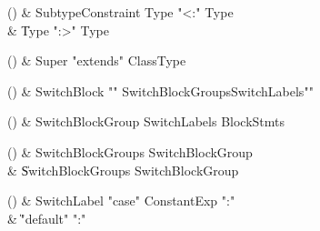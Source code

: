 \begin{bbgrammarappendix}{3.3in}

() & SubtypeConstraint \label{prod:SubtypeConstraint}  \: Type  \xcd"<:" Type   \\

 &    \| Type  \xcd":>" Type  \\

\end{bbgrammarappendix}

\begin{bbgrammarappendix}{4.5in}

() & Super \label{prod:Super}  \: \xcd"extends" ClassType  \\


\end{bbgrammarappendix}

\begin{bbgrammarappendix}{3.9in}

() & SwitchBlock \label{prod:SwitchBlock}  \: \xcd"{" SwitchBlockGroups\opt SwitchLabels\opt \xcd"}"  \\


\end{bbgrammarappendix}

\begin{bbgrammarappendix}{3.4in}

() & SwitchBlockGroup \label{prod:SwitchBlockGroup}  \: SwitchLabels BlockStmts  \\


\end{bbgrammarappendix}

\begin{bbgrammarappendix}{3.3in}

() & SwitchBlockGroups \label{prod:SwitchBlockGroups}  \: SwitchBlockGroup  \\

 &    \| SwitchBlockGroups SwitchBlockGroup \\

\end{bbgrammarappendix}

\begin{bbgrammarappendix}{3.9in}

() & SwitchLabel \label{prod:SwitchLabel}  \: \xcd"case" ConstantExp \xcd":"  \\

 &    \| \xcd"default" \xcd":" \\

\end{bbgrammarappendix}

